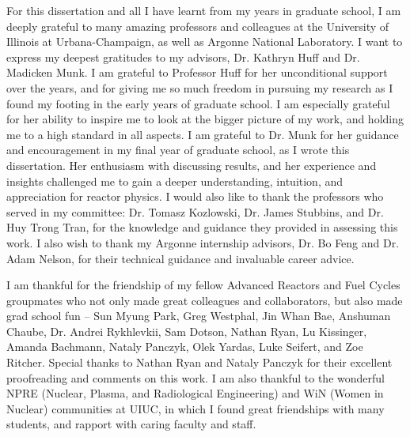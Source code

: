 For this dissertation and all I have learnt from my years in graduate school, 
I am deeply grateful to many amazing professors and colleagues at the University of 
Illinois at Urbana-Champaign, as well as Argonne National Laboratory. 
I want to express my deepest gratitudes to my advisors, Dr. Kathryn Huff and Dr. 
Madicken Munk. 
I am grateful to Professor Huff for her unconditional support over the years, and for 
giving me so much freedom in pursuing my research as I found my footing in the early 
years of graduate school. 
I am especially grateful for her ability to inspire me to look at the bigger picture of 
my work, and holding me to a high standard in all aspects.
I am grateful to Dr. Munk for her guidance and encouragement in my final year 
of graduate school, as I wrote this dissertation. 
Her enthusiasm with discussing results, and her experience and insights challenged me to 
gain a deeper understanding, intuition, and appreciation for reactor physics.  
I would also like to thank the professors who served in my committee: Dr. Tomasz 
Kozlowski, Dr. James Stubbins, and Dr. Huy Trong Tran, for the knowledge and guidance 
they provided in assessing this work. 
I also wish to thank my Argonne internship advisors, Dr. Bo Feng and Dr. Adam Nelson, 
for their technical guidance and invaluable career advice. 

I am thankful for the friendship of my fellow Advanced Reactors and Fuel Cycles 
groupmates who not only made great colleagues and collaborators, but also made 
grad school fun -- Sun Myung Park, Greg Westphal, Jin Whan Bae, Anshuman Chaube, 
Dr. Andrei Rykhlevkii, Sam Dotson, Nathan Ryan, Lu Kissinger, Amanda Bachmann, 
Nataly Panczyk, Olek Yardas, Luke Seifert, and Zoe Ritcher. 
Special thanks to Nathan Ryan and Nataly Panczyk for their excellent proofreading 
and comments on this work. 
I am also thankful to the wonderful NPRE (Nuclear, Plasma, and Radiological Engineering) 
and WiN (Women in Nuclear) communities at UIUC, in which I found great friendships with 
many students, and rapport with caring faculty and staff. 




